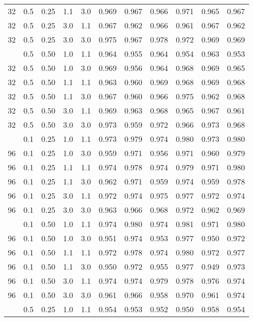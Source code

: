 \begin{longtable}[t]{cccccrrrrrr}
32 & 0.5 & 0.25 & 1.1 & 3.0 & 0.969 & 0.967 & 0.966 & 0.971 & 0.965 & 0.967\\
32 & 0.5 & 0.25 & 3.0 & 1.1 & 0.967 & 0.962 & 0.966 & 0.961 & 0.967 & 0.962\\
32 & 0.5 & 0.25 & 3.0 & 3.0 & 0.975 & 0.967 & 0.978 & 0.972 & 0.969 & 0.969\\
\addlinespace
32 & 0.5 & 0.50 & 1.0 & 1.1 & 0.964 & 0.955 & 0.964 & 0.954 & 0.963 & 0.953\\
32 & 0.5 & 0.50 & 1.0 & 3.0 & 0.969 & 0.956 & 0.964 & 0.968 & 0.969 & 0.965\\
32 & 0.5 & 0.50 & 1.1 & 1.1 & 0.963 & 0.960 & 0.969 & 0.968 & 0.969 & 0.968\\
32 & 0.5 & 0.50 & 1.1 & 3.0 & 0.967 & 0.960 & 0.966 & 0.975 & 0.962 & 0.968\\
32 & 0.5 & 0.50 & 3.0 & 1.1 & 0.969 & 0.963 & 0.968 & 0.965 & 0.967 & 0.961\\
32 & 0.5 & 0.50 & 3.0 & 3.0 & 0.973 & 0.959 & 0.972 & 0.966 & 0.973 & 0.968\\
\addlinespace
96 & 0.1 & 0.25 & 1.0 & 1.1 & 0.973 & 0.979 & 0.974 & 0.980 & 0.973 & 0.980\\
96 & 0.1 & 0.25 & 1.0 & 3.0 & 0.959 & 0.971 & 0.956 & 0.971 & 0.960 & 0.979\\
96 & 0.1 & 0.25 & 1.1 & 1.1 & 0.974 & 0.978 & 0.974 & 0.979 & 0.971 & 0.980\\
96 & 0.1 & 0.25 & 1.1 & 3.0 & 0.962 & 0.971 & 0.959 & 0.974 & 0.959 & 0.978\\
96 & 0.1 & 0.25 & 3.0 & 1.1 & 0.972 & 0.974 & 0.975 & 0.977 & 0.972 & 0.974\\
96 & 0.1 & 0.25 & 3.0 & 3.0 & 0.963 & 0.966 & 0.968 & 0.972 & 0.962 & 0.969\\
\addlinespace
96 & 0.1 & 0.50 & 1.0 & 1.1 & 0.974 & 0.980 & 0.974 & 0.981 & 0.971 & 0.980\\
96 & 0.1 & 0.50 & 1.0 & 3.0 & 0.951 & 0.974 & 0.953 & 0.977 & 0.950 & 0.972\\
96 & 0.1 & 0.50 & 1.1 & 1.1 & 0.972 & 0.978 & 0.974 & 0.980 & 0.972 & 0.977\\
96 & 0.1 & 0.50 & 1.1 & 3.0 & 0.950 & 0.972 & 0.955 & 0.977 & 0.949 & 0.973\\
96 & 0.1 & 0.50 & 3.0 & 1.1 & 0.974 & 0.974 & 0.979 & 0.978 & 0.976 & 0.974\\
96 & 0.1 & 0.50 & 3.0 & 3.0 & 0.961 & 0.966 & 0.958 & 0.970 & 0.961 & 0.974\\
\addlinespace
96 & 0.5 & 0.25 & 1.0 & 1.1 & 0.954 & 0.953 & 0.952 & 0.950 & 0.958 & 0.954\\

\end{longtable}
